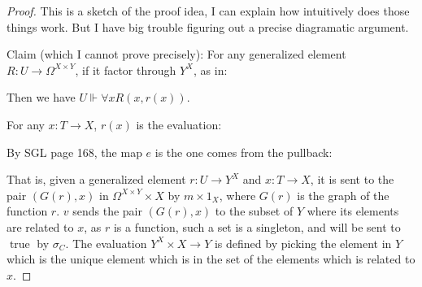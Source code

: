 \documentclass[a4paper]{article}
\DeclareMathOperator{\true}{\text {true}}
\begin{document}
\begin{proof}
    This is a sketch of the proof idea, I can explain how intuitively does those things work. But I have big trouble figuring out a precise diagramatic argument. 

    Claim (which I cannot prove precisely): For any generalized element $R:U\to \Omega^{X\times Y}$, if it factor through $Y^X$, as in:
    
    \begin{center}
    \end{center}

    Then we have $U\Vdash\forall x R(x,r(x))$.

    For any $x:T\to X$, $r(x)$ is the evaluation:
    \begin{center}
    \end{center}
    By SGL page 168, the map $e$ is the one comes from the pullback:

    \begin{center}
    \end{center}

    That is, given a generalized element $r:U\to Y^X$ and $x:T\to X$, it is sent to the pair $(G(r),x)$ in $\Omega^{X\times Y}\times X$ by $m\times 1_X$, where $G(r)$ is the graph of the function $r$. $v$ sends the pair $(G(r),x)$ to the subset of $Y$ where its elements are related to $x$, as $r$ is a function, such a set is a singleton, and will be sent to $\true$ by $\sigma_C$. The evaluation $Y^X\times X\to Y$ is defined by picking the element in $Y$ which is the unique element which is in the set of the elements which is related to $x$.


\end{proof}
\end{document}
